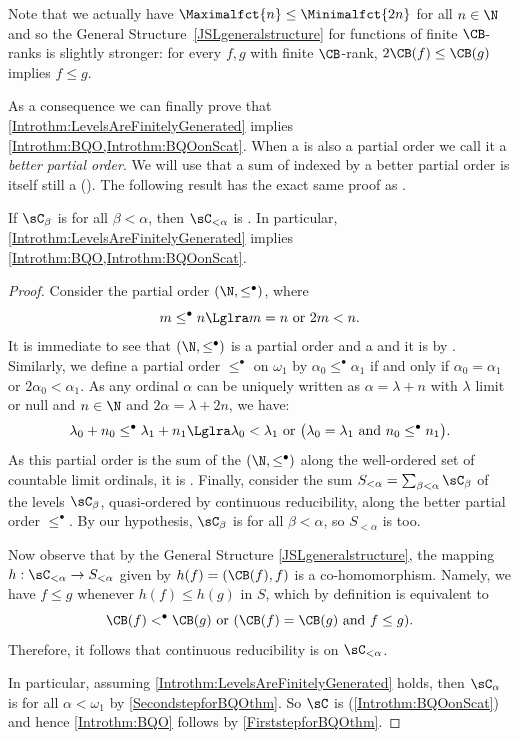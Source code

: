 \begin{remark}
Note that we actually have $\Maximalfct{n}\leq \Minimalfct{2n}$ for all $n\in\N$ and so the General Structure~\cref{JSLgeneralstructure} for functions of finite $\CB$-ranks is slightly stronger: for every $f,g$ with finite $\CB$-rank, $2\CB(f)\leq \CB(g)$ implies $f\leq g$.
\end{remark}

As a consequence we can finally prove that \cref{Introthm:LevelsAreFinitelyGenerated} implies \cref{Introthm:BQO,Introthm:BQOonScat}.
When a \bqo{} is also a partial order we call it a \emph{better partial order}.
We will use that a sum of \bqo{} indexed by a better partial order is itself still a \bqo{} (\cite[(9.14)]{simpsonbqo}).
The following result has the exact same proof as \cite[Theorem 5.4]{carroy2013quasi}.

\begin{proposition}\label{FGgivesBQO_2}
If $\sC_{\beta}$ is \bqo{} for all $\beta<\alpha$, then $\sC_{<\alpha}$ is \bqo{}.
In particular, \cref{Introthm:LevelsAreFinitelyGenerated} implies \cref{Introthm:BQO,Introthm:BQOonScat}.
\end{proposition}

\begin{proof}
Consider the partial order $(\N, \leq^\bullet)$, where 
\[
m\leq^\bullet n \Lglra m=n \text{ or }2m<n.
\]
It is immediate to see that $(\N,\leq^\bullet)$ is a partial order and a \wqo{} and it is  \bqo{} by \cite[Example 1.6]{CarroyYPFromWell}. 
Similarly, we define a partial order $\leq^\bullet$ on $\omega_1$ by $\alpha_0\leq^\bullet \alpha_1$ if and only if $\alpha_0=\alpha_1$ or $2\alpha_0<\alpha_1$. As any ordinal $\alpha$ can be uniquely written as $\alpha=\lambda+n$ with $\lambda$ limit or null and $n\in\N$ and $2\alpha=\lambda+2n$, we have: 
\[
\lambda_0+n_0 \leq^\bullet \lambda_1+n_1 \Lglra \lambda_0<\lambda_1\mbox{ or } \bigl(\lambda_0=\lambda_1\mbox{ and } n_0\leq^\bullet n_1 \bigr).
\]
As this partial order is the sum of the \bqo{} $(\N,\leq^\bullet)$ along the well-ordered set of countable limit ordinals, it is \bqo{}.
Finally, consider the sum $S_{<\alpha}=\sum_{\beta<\alpha} \sC_{\beta}$ of the levels $\sC_\beta$, quasi-ordered by continuous reducibility, along the better partial order $\leq^\bullet$. By our hypothesis, $\sC_\beta$ is \bqo{} for all $\beta<\alpha$, so $S_{<\alpha}$ is \bqo{} too. 
 
Now observe that by the General Structure \cref{JSLgeneralstructure}, the mapping $h:\sC_{<\alpha}\to S_{<\alpha}$ given by $h(f)= (\CB(f),f)$ is a co-homomorphism. Namely, we have $f\leq g$ whenever $h(f)\leq h(g)$ in $S$, which by definition is equivalent to 
\[
\CB(f)<^\bullet \CB(g) \text{ or } (\CB(f)=\CB(g) \text{ and } f\leq g).
\]
Therefore, it follows that continuous reducibility is \bqo{} on $\sC_{<\alpha}$.

In particular, assuming \cref{Introthm:LevelsAreFinitelyGenerated} holds, then $\sC_\alpha$ is \bqo{} for all $\alpha<\omega_1$ by \cref{SecondstepforBQOthm}.  So $\sC$ is \bqo{} (\cref{Introthm:BQOonScat}) and hence \cref{Introthm:BQO} follows by \cref{FirststepforBQOthm}. 

\end{proof}


